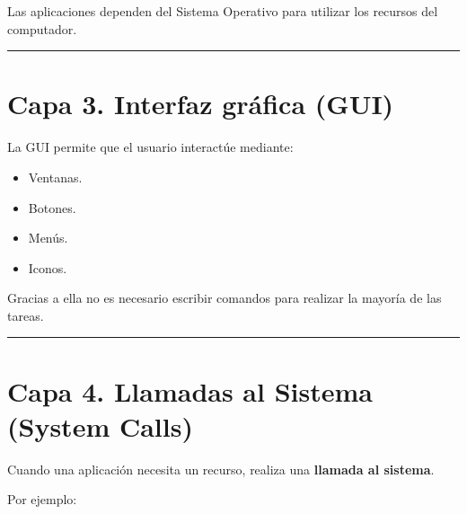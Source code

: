 \documentclass[
  spanish,
  letterpaper,
]{scrbook}
\providecommand{\tightlist}{%
  \setlength{\itemsep}{0pt}\setlength{\parskip}{0pt}}
\begin{document}
\begin{tcolorbox}[enhanced jigsaw, arc=.35mm, bottomrule=.15mm, bottomtitle=1mm, breakable, colback=white, colbacktitle=quarto-callout-note-color!10!white, colframe=quarto-callout-note-color-frame, coltitle=black, left=2mm, leftrule=.75mm, opacityback=0, opacitybacktitle=0.6, rightrule=.15mm, title=\textcolor{quarto-callout-note-color}{\faInfo}\hspace{0.5em}{Idea importante}, titlerule=0mm, toprule=.15mm, toptitle=1mm]

Las aplicaciones dependen del Sistema Operativo para utilizar los
recursos del computador.

\end{tcolorbox}

\begin{center}\rule{0.5\linewidth}{0.5pt}\end{center}


\chapter{Capa 3. Interfaz gráfica
(GUI)}\label{capa-3.-interfaz-gruxe1fica-gui}

La GUI permite que el usuario interactúe mediante:

\begin{itemize}
\tightlist
\item
  Ventanas.
\item
  Botones.
\item
  Menús.
\item
  Iconos.
\end{itemize}

Gracias a ella no es necesario escribir comandos para realizar la
mayoría de las tareas.

\begin{center}\rule{0.5\linewidth}{0.5pt}\end{center}


\chapter{Capa 4. Llamadas al Sistema (System
Calls)}\label{capa-4.-llamadas-al-sistema-system-calls}

Cuando una aplicación necesita un recurso, realiza una \textbf{llamada
al sistema}.

Por ejemplo:
\end{document}

